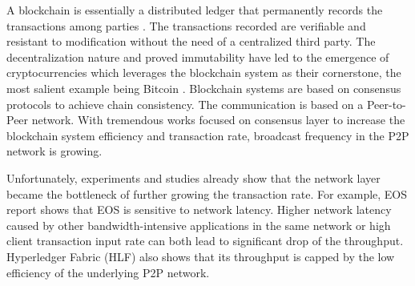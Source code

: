 A blockchain is essentially a distributed ledger that permanently records the transactions among parties \cite{iansiti2018truth}. The transactions recorded are verifiable and resistant to modification without the need of a centralized third party. The decentralization nature and proved immutability have led to the emergence of cryptocurrencies which leverages the blockchain system as their cornerstone, the most salient example being Bitcoin \cite{nakamoto2008bitcoin}. Blockchain systems are based on consensus protocols to achieve chain consistency. The communication is based on a Peer-to-Peer network. With tremendous works focused on consensus layer to increase the blockchain system efficiency and transaction rate, broadcast frequency in the P2P network is growing.


Unfortunately, experiments and studies \cite{cachin2016architecture, xueos, li2018scaling} already show that the network layer became the bottleneck of further growing the transaction rate. For example, EOS report \cite{xueos} shows that EOS is sensitive to network latency. Higher network latency caused by other bandwidth-intensive applications in the same network or high client transaction input rate can both lead to significant drop of the throughput. Hyperledger Fabric (HLF) \cite{cachin2016architecture} also shows that its throughput is capped by the low efficiency of the underlying P2P network. 

